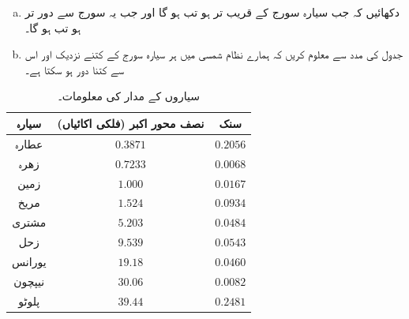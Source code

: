 %
\begin{enumerate}[a.]
\item
دکھائیں کہ جب سیارہ سورج کے قریب تر ہو تب  ہو گا اور جب یہ سورج سے دور تر ہو تب  ہو گا۔
\item
 جدول    کی مدد سے معلوم کریں کہ ہمارے  نظام شمسی میں ہر سیارہ سورج کے کتنے نزدیک اور اس سے کتنا دور ہو سکتا ہے۔
\end{enumerate}
%
\begin{table}
\caption{سیاروں کے مدار کی معلومات۔}
\label{جدول_سوالات_سورج_سیارے}
\centering
\begin{tabular}{ccc}
\toprule
سیارہ& نصف محور اکبر (فلکی اکائیاں) & سنک\\
\midrule
عطارہ&$0.3871$& $0.2056$\\
زھرہ&$0.7233$  & $0.0068$\\
زمین& $1.000$  &  $0.0167$\\
مریخ&  $1.524$  &  $0.0934$  \\
مشتری&  $5.203$   &  $0.0484$\\
زحل&  $9.539$  &  $0.0543$\\
یورانس&  $19.18$  &  $0.0460$\\
نیپچون&  $30.06$  &  $0.0082$\\
پلوٹو&  $39.44$   &  $0.2481$\\
\bottomrule
\end{tabular}
\end{table}



